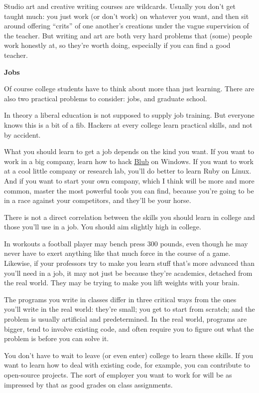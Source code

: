 Studio art and creative writing courses are wildcards. Usually you don't
get taught much: you just work (or don't work) on whatever you want, and
then sit around offering ``crits'' of one another's creations under the
vague supervision of the teacher. But writing and art are both very hard
problems that (some) people work honestly at, so they're worth doing,
especially if you can find a good teacher.

\textbf{Jobs}

Of course college students have to think about more than just learning.
There are also two practical problems to consider: jobs, and graduate
school.

In theory a liberal education is not supposed to supply job training.
But everyone knows this is a bit of a fib. Hackers at every college
learn practical skills, and not by accident.

What you should learn to get a job depends on the kind you want. If you
want to work in a big company, learn how to hack \href{avg.html}{Blub}
on Windows. If you want to work at a cool little company or research
lab, you'll do better to learn Ruby on Linux. And if you want to start
your own company, which I think will be more and more common, master the
most powerful tools you can find, because you're going to be in a race
against your competitors, and they'll be your horse.

There is not a direct correlation between the skills you should learn in
college and those you'll use in a job. You should aim slightly high in
college.

In workouts a football player may bench press 300 pounds, even though he
may never have to exert anything like that much force in the course of a
game. Likewise, if your professors try to make you learn stuff that's
more advanced than you'll need in a job, it may not just be because
they're academics, detached from the real world. They may be trying to
make you lift weights with your brain.

The programs you write in classes differ in three critical ways from the
ones you'll write in the real world: they're small; you get to start
from scratch; and the problem is usually artificial and predetermined.
In the real world, programs are bigger, tend to involve existing code,
and often require you to figure out what the problem is before you can
solve it.

You don't have to wait to leave (or even enter) college to learn these
skills. If you want to learn how to deal with existing code, for
example, you can contribute to open-source projects. The sort of
employer you want to work for will be as impressed by that as good
grades on class assignments.

